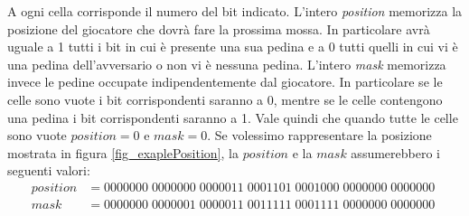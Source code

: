 \documentclass[a4paper]{article}
\begin{document}
A ogni cella corrisponde il numero del bit indicato. L'intero \emph{position} 
memorizza la posizione del giocatore che dovrà fare la prossima mossa. In 
particolare avrà uguale a 1 tutti i bit in cui è presente una sua pedina e a 0
tutti quelli in cui vi è una pedina dell'avversario o non vi è nessuna pedina. 
L'intero \emph{mask} memorizza invece le pedine occupate indipendentemente dal
giocatore. In particolare se le celle sono vuote i bit corrispondenti saranno a 0, 
mentre se le celle contengono una pedina i bit corrispondenti saranno a 1. 
Vale quindi che quando tutte le celle sono vuote $position = 0$ e $mask = 0$. Se 
volessimo rappresentare la posizione mostrata in figura \ref{fig_exaplePosition},
la $position$ e la $mask$ assumerebbero i seguenti valori:
\begin{align*}
  position &= 0000000\; 0000000\; 0000011\; 0001101\; 0001000\; 0000000\; 0000000\\
  mask &= 0000000\; 0000001\; 0000011\; 0011111\; 0001111\; 0000000\; 0000000\;
\end{align*}
\end{document}
